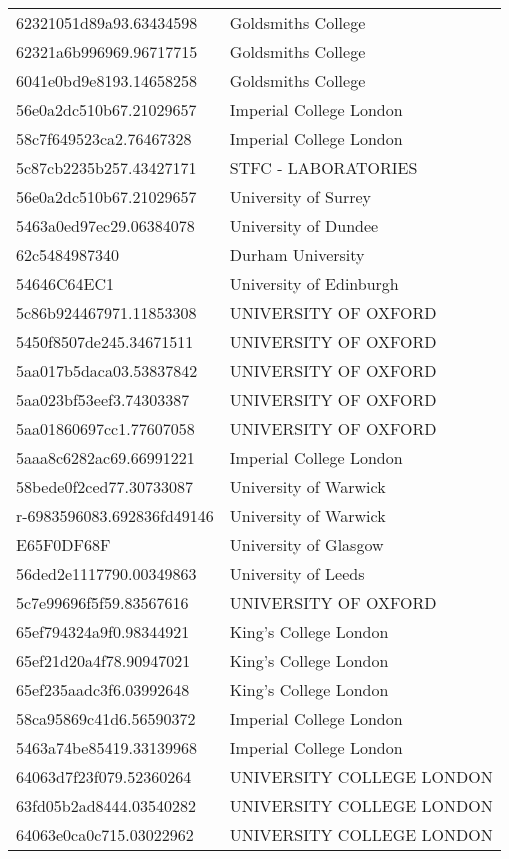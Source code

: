 \begin{tabular}{ll}
62321051d89a93.63434598 & Goldsmiths College \\
62321a6b996969.96717715 & Goldsmiths College \\
6041e0bd9e8193.14658258 & Goldsmiths College \\
56e0a2dc510b67.21029657 & Imperial College London \\
58c7f649523ca2.76467328 & Imperial College London \\
5c87cb2235b257.43427171 & STFC - LABORATORIES \\
56e0a2dc510b67.21029657 & University of Surrey \\
5463a0ed97ec29.06384078 & University of Dundee \\
62c5484987340 & Durham University \\
54646C64EC1 & University of Edinburgh \\
5c86b924467971.11853308 & UNIVERSITY OF OXFORD \\
5450f8507de245.34671511 & UNIVERSITY OF OXFORD \\
5aa017b5daca03.53837842 & UNIVERSITY OF OXFORD \\
5aa023bf53eef3.74303387 & UNIVERSITY OF OXFORD \\
5aa01860697cc1.77607058 & UNIVERSITY OF OXFORD \\
5aaa8c6282ac69.66991221 & Imperial College London \\
58bede0f2ced77.30733087 & University of Warwick \\
r-6983596083.692836fd49146 & University of Warwick \\
E65F0DF68F & University of Glasgow \\
56ded2e1117790.00349863 & University of Leeds \\
5c7e99696f5f59.83567616 & UNIVERSITY OF OXFORD \\
65ef794324a9f0.98344921 & King's College London \\
65ef21d20a4f78.90947021 & King's College London \\
65ef235aadc3f6.03992648 & King's College London \\
58ca95869c41d6.56590372 & Imperial College London \\
5463a74be85419.33139968 & Imperial College London \\
64063d7f23f079.52360264 & UNIVERSITY COLLEGE LONDON \\
63fd05b2ad8444.03540282 & UNIVERSITY COLLEGE LONDON \\
64063e0ca0c715.03022962 & UNIVERSITY COLLEGE LONDON \\

\end{tabular}
